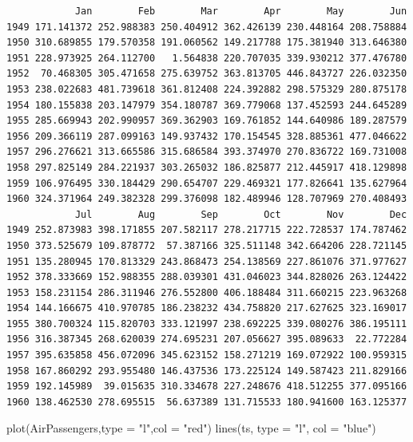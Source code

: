 \documentclass[
  letterpaper,
  DIV=11,
  numbers=noendperiod]{scrreprt}
\newenvironment{Shaded}{\begin{snugshade}}{\end{snugshade}}
\newcommand{\AttributeTok}[1]{\textcolor[rgb]{0.40,0.45,0.13}{#1}}
\newcommand{\FunctionTok}[1]{\textcolor[rgb]{0.28,0.35,0.67}{#1}}
\newcommand{\NormalTok}[1]{\textcolor[rgb]{0.00,0.23,0.31}{#1}}
\newcommand{\StringTok}[1]{\textcolor[rgb]{0.13,0.47,0.30}{#1}}
\begin{document}
\begin{verbatim}
            Jan        Feb        Mar        Apr        May        Jun
1949 171.141372 252.988383 250.404912 362.426139 230.448164 208.758884
1950 310.689855 179.570358 191.060562 149.217788 175.381940 313.646380
1951 228.973925 264.112700   1.564838 220.707035 339.930212 377.476780
1952  70.468305 305.471658 275.639752 363.813705 446.843727 226.032350
1953 238.022683 481.739618 361.812408 224.392882 298.575329 280.875178
1954 180.155838 203.147979 354.180787 369.779068 137.452593 244.645289
1955 285.669943 202.990957 369.362903 169.761852 144.640986 189.287579
1956 209.366119 287.099163 149.937432 170.154545 328.885361 477.046622
1957 296.276621 313.665586 315.686584 393.374970 270.836722 169.731008
1958 297.825149 284.221937 303.265032 186.825877 212.445917 418.129898
1959 106.976495 330.184429 290.654707 229.469321 177.826641 135.627964
1960 324.371964 249.382328 299.376098 182.489946 128.707969 270.408493
            Jul        Aug        Sep        Oct        Nov        Dec
1949 252.873983 398.171855 207.582117 278.217715 222.728537 174.787462
1950 373.525679 109.878772  57.387166 325.511148 342.664206 228.721145
1951 135.280945 170.813329 243.868473 254.138569 227.861076 371.977627
1952 378.333669 152.988355 288.039301 431.046023 344.828026 263.124422
1953 158.231154 286.311946 276.552800 406.188484 311.660215 223.963268
1954 144.166675 410.970785 186.238232 434.758820 217.627625 323.169017
1955 380.700324 115.820703 333.121997 238.692225 339.080276 386.195111
1956 316.387345 268.620039 274.695231 207.056627 395.089633  22.772284
1957 395.635858 456.072096 345.623152 158.271219 169.072922 100.959315
1958 167.860292 293.955480 146.437536 173.225124 149.587423 211.829166
1959 192.145989  39.015635 310.334678 227.248676 418.512255 377.095166
1960 138.462530 278.695515  56.637389 131.715533 180.941600 163.125377
\end{verbatim}

\begin{Shaded}
\begin{Highlighting}[]
\FunctionTok{plot}\NormalTok{(AirPassengers,}\AttributeTok{type =} \StringTok{"l"}\NormalTok{,}\AttributeTok{col =} \StringTok{"red"}\NormalTok{)}
\FunctionTok{lines}\NormalTok{(ts, }\AttributeTok{type =} \StringTok{"l"}\NormalTok{, }\AttributeTok{col =} \StringTok{"blue"}\NormalTok{)}
\end{Highlighting}
\end{Shaded}
\end{document}
